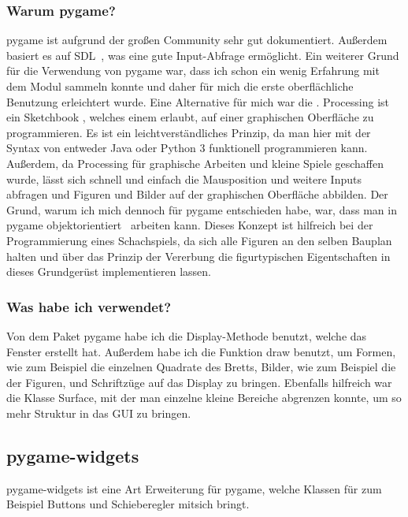 \documentclass[a4paper, 10pt]{scrartcl}
\begin{document}
\subsubsection*{Warum pygame?}
\glqq pygame\grqq{} ist aufgrund der großen Community sehr gut dokumentiert.
Außerdem basiert es auf SDL~\cite{SDL}, was eine gute Input-Abfrage ermöglicht.
Ein weiterer Grund für die Verwendung von \glqq pygame\grqq{} war, dass ich schon ein
wenig Erfahrung mit dem Modul sammeln konnte und daher für mich die erste
oberflächliche Benutzung erleichtert wurde.
Eine Alternative für mich war die \href{https://processing.org/}{\color{blue}{\glqq Processing\grqq}}.
\glqq Processing\grqq{} ist ein \glqq Sketchbook \grqq{} , welches einem erlaubt,
auf einer graphischen Oberfläche zu programmieren. Es ist ein leichtverständliches
Prinzip, da man hier mit der Syntax von entweder Java oder Python 3 funktionell programmieren
kann. Außerdem, da Processing für graphische Arbeiten und kleine Spiele geschaffen wurde,
lässt sich schnell und einfach die Mausposition und weitere Inputs abfragen und
Figuren und Bilder auf der graphischen Oberfläche abbilden.
Der Grund, warum ich mich dennoch für \glqq pygame\grqq{} entschieden habe, war, dass man in \glqq pygame\grqq{}
objektorientiert~\cite{OOP} arbeiten kann. Dieses Konzept ist hilfreich bei der Programmierung eines Schachspiels,
da sich alle Figuren an den selben \glqq Bauplan\grqq{}  halten und über das Prinzip der Vererbung
die figurtypischen Eigentschaften in dieses Grundgerüst implementieren lassen.

\subsubsection*{Was habe ich verwendet?}
Von dem Paket \glqq pygame\grqq{} habe ich die \glqq Display\grqq{}-Methode benutzt, welche das Fenster erstellt hat. Außerdem habe ich
die Funktion \glqq draw\grqq{} benutzt, um Formen, wie zum Beispiel die einzelnen Quadrate des Bretts, Bilder, wie zum Beispiel die der Figuren,
und Schriftzüge auf das Display zu bringen. Ebenfalls hilfreich war die Klasse \glqq Surface\grqq , mit der man einzelne kleine Bereiche abgrenzen konnte,
um so mehr Struktur in das GUI zu bringen.  

\subsection{pygame-widgets}
\glqq pygame-widgets\grqq{} ist eine Art Erweiterung für \glqq pygame\grqq , welche Klassen für zum Beispiel Buttons und Schieberegler mitsich bringt.
\end{document}
